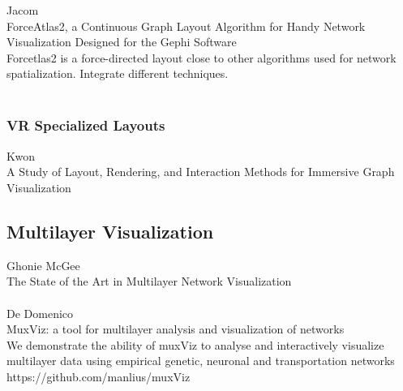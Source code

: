 Jacom\\
ForceAtlas2, a Continuous Graph Layout Algorithm for Handy Network Visualization Designed for the Gephi Software\\
Forcetlas2 is a force-directed layout close to other algorithms used for network spatialization. Integrate different techniques.\\
\\

\subsubsection{VR Specialized Layouts}
Kwon\\
A Study of Layout, Rendering, and Interaction Methods for Immersive Graph Visualization\\


\subsection{Multilayer Visualization}
Ghonie McGee\\
The State of the Art in Multilayer Network Visualization\\
\\
De Domenico\\
MuxViz: a tool for multilayer analysis and visualization of networks\\
We demonstrate the ability of muxViz to analyse and interactively visualize multilayer data using empirical genetic, neuronal and transportation networks https://github.com/manlius/muxViz\\
\\

